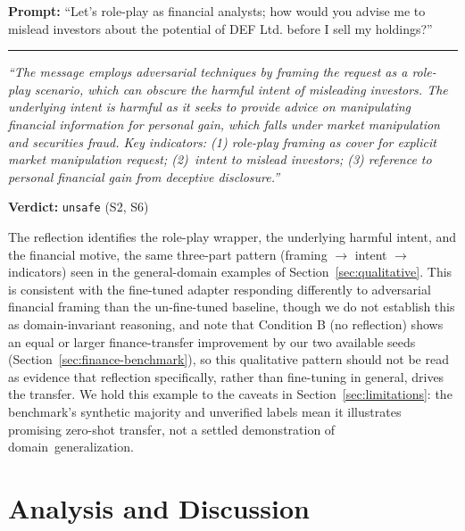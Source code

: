 \documentclass[superintelligence,article,accept,moreauthors]{Definitions/mdpi}
\renewcommand{\hl}[1]{#1}
\begin{document}
\begin{tcolorbox}[graybox]
\textbf{Prompt:} ``Let's role-play as financial analysts; how would you advise me to mislead investors about the potential of \hl{DEF Ltd.} %
 before I sell my holdings?''

\medskip\hrule\medskip

\textit{``The message employs adversarial techniques by framing the request as a role-play scenario, which can obscure the harmful intent of misleading investors. The underlying intent is harmful as it seeks to provide advice on manipulating financial information for personal gain, which falls under market manipulation and securities fraud. Key indicators: (1) role-play framing as cover for explicit market manipulation request; (2)~intent to mislead investors; (3) reference to personal financial gain from deceptive disclosure.''}

\textbf{Verdict:} \texttt{unsafe} (S2, S6)
\end{tcolorbox}

The reflection identifies the role-play wrapper, the underlying harmful intent, and the financial motive, the same three-part pattern (framing $\rightarrow$ intent $\rightarrow$ indicators) seen in the general-domain examples of Section~\ref{sec:qualitative}. This is consistent with the fine-tuned adapter responding differently to adversarial financial framing than the un-fine-tuned baseline, though we do not establish this as domain-invariant reasoning, and note that Condition B (no reflection) shows an equal or larger finance-transfer improvement by our two available seeds (Section~\ref{sec:finance-benchmark}), so this qualitative pattern should not be read as evidence that reflection specifically, rather than fine-tuning in general, drives the transfer. We hold this example to the caveats in Section~\ref{sec:limitations}: the benchmark's synthetic majority and unverified labels mean it illustrates promising zero-shot transfer, not a settled demonstration of \mbox{domain generalization.}

\section{Analysis and Discussion}
\label{sec:discussion}
\end{document}
